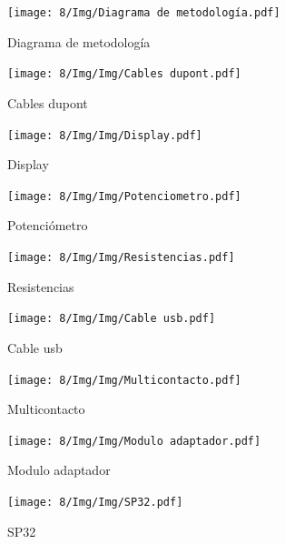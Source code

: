     \begin{figure}[H]
        \centering
        \texttt{[image: 8/Img/Diagrama de metodología.pdf]}
        \caption{Diagrama de metodología}
        \label{Diagrama de metodologia}
    \end{figure}
    
    \begin{figure}[H]
        \centering
        \texttt{[image: 8/Img/Img/Cables dupont.pdf]}
        \caption{Cables dupont}
        \label{Cables dupont}
    \end{figure}
    
    \begin{figure}[H]
        \centering
        \texttt{[image: 8/Img/Img/Display.pdf]}
        \caption{Display}
        \label{Display}
    \end{figure}
    
    \begin{figure}[H]
        \centering
        \texttt{[image: 8/Img/Img/Potenciometro.pdf]}
        \caption{Potenciómetro}
        \label{potenciometro}
    \end{figure}
    
    \begin{figure}[H]
        \centering
        \texttt{[image: 8/Img/Img/Resistencias.pdf]}
        \caption{Resistencias}
        \label{Resistencias}
    \end{figure}
    
    \begin{figure}[H]
        \centering
        \texttt{[image: 8/Img/Img/Cable usb.pdf]}
        \caption{Cable usb}
        \label{Cable usb}
    \end{figure}
    
    \begin{figure}[H]
        \centering
        \texttt{[image: 8/Img/Img/Multicontacto.pdf]}
        \caption{Multicontacto}
        \label{Multicontacto}
    \end{figure}
    
    \begin{figure}[H]
        \centering
        \texttt{[image: 8/Img/Img/Modulo adaptador.pdf]}
        \caption{Modulo adaptador}
        \label{Modulo adaptador}
    \end{figure}
    
    \begin{figure}[H]
        \centering
        \texttt{[image: 8/Img/Img/SP32.pdf]}
        \caption{SP32}
        \label{SP32}
    \end{figure}
    
